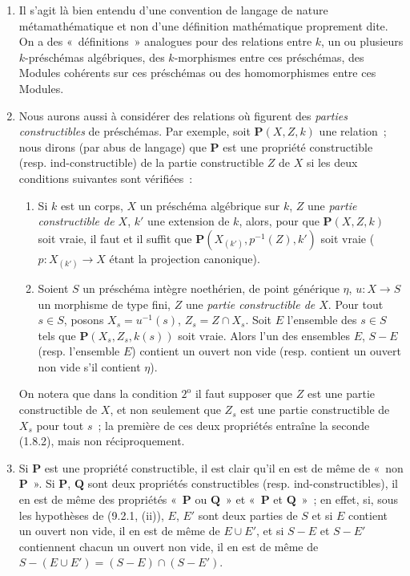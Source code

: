 \begin{remarks}[9.2.2]
\label{IV.9.2.2-fr}
\begin{enumerate}[label=(\roman*)]
  \item Il s'agit là bien entendu d'une convention de langage de nature
  métamathématique et non d'une définition mathématique proprement dite. On a
  des «~définitions~» analogues pour des relations entre $k$, un ou plusieurs
  $k$-préschémas algébriques, des $k$-morphismes entre ces préschémas, des
  Modules cohérents sur ces préschémas ou des homomorphismes entre ces Modules.

  \item Nous aurons aussi à considérer des relations où figurent des
  \emph{parties constructibles} de préschémas. Par exemple, soit
  $\mathbf P(X,Z,k)$ une relation~; nous dirons (par abus de langage) que
  $\mathbf P$ est une propriété constructible (resp. ind-constructible) de la
  partie constructible $Z$ de $X$ si les deux conditions suivantes sont
  vérifiées~:
  \begin{enumerate}[label=$\arabic*^{\mathrm o}$]
    \item Si $k$ est un corps, $X$ un préschéma algébrique sur $k$, $Z$ une
    \emph{partie constructible de $X$}, $k'$ une extension de $k$, alors, pour
    que $\mathbf P(X,Z,k)$ soit vraie, il faut et il suffit que
    $\mathbf P(X_{(k')},p^{-1}(Z),k')$ soit vraie
    ($p:X_{(k')}\to X$ étant la projection canonique).
    \item Soient $S$ un préschéma intègre noethérien, de point générique
    $\eta$, $u:X\to S$ un morphisme de type fini, $Z$ une
    \emph{partie constructible de $X$}. Pour tout $s\in S$, posons
    $X_s=u^{-1}(s)$, $Z_s=Z\cap X_s$. Soit $E$ l'ensemble des $s\in S$ tels
    que $\mathbf P(X_s,Z_s,k(s))$ soit vraie. Alors l'un des ensembles $E$,
    $S-E$ (resp. l'ensemble $E$) contient un ouvert non vide (resp. contient
    un ouvert non vide s'il contient $\eta$).
  \end{enumerate}

  On notera que dans la condition $2^{\mathrm o}$ il faut supposer que $Z$ est
  une partie constructible de $X$, et non seulement que $Z_s$ est une partie
  constructible de $X_s$ pour tout $s$~; la première de ces deux propriétés
  entraîne la seconde (1.8.2), mais non réciproquement.

  \item Si $\mathbf P$ est une propriété constructible, il est clair qu'il en
  est de même de «~non $\mathbf P$~». Si $\mathbf P$, $\mathbf Q$ sont deux
  propriétés constructibles (resp. ind-constructibles), il en est de même des
  propriétés «~$\mathbf P$ ou $\mathbf Q$~» et «~$\mathbf P$ et
  $\mathbf Q$~»~; en effet, si, sous les hypothèses de (9.2.1, (ii)), $E$,
  $E'$ sont deux parties de $S$ et si $E$ contient un ouvert non vide, il en
  est de même de $E\cup E'$, et si $S-E$ et $S-E'$ contiennent chacun un
  ouvert non vide, il en est de même de
  $S-(E\cup E')=(S-E)\cap(S-E')$.


\end{enumerate}
\end{remarks}
